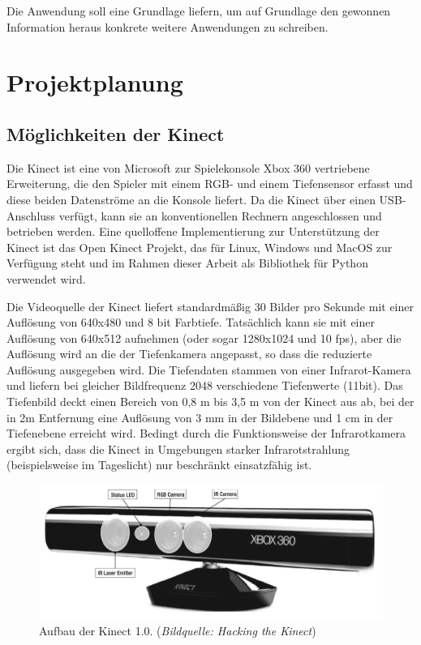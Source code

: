 \documentclass[12pt,a4paper,ngerman]{scrartcl}
\begin{document}
Die Anwendung soll eine Grundlage liefern, um auf Grundlage den gewonnen Information
heraus konkrete weitere Anwendungen zu schreiben.


\section{Projektplanung}

\subsection{Möglichkeiten der Kinect}
\label{sec:kinect}

Die Kinect ist eine von Microsoft\cite{microsoft} zur Spielekonsole Xbox 360 vertriebene Erweiterung,
die den Spieler mit einem RGB- und einem Tiefensensor erfasst und diese beiden
Datenströme an die Konsole liefert. Da die Kinect über einen USB-Anschluss verfügt,
kann sie an konventionellen Rechnern angeschlossen und betrieben werden. Eine
quelloffene Implementierung zur Unterstützung der Kinect ist das Open Kinect Projekt,
das für Linux, Windows und MacOS zur Verfügung steht und im Rahmen dieser Arbeit
als Bibliothek für Python verwendet wird.\cite{openkinect}\cite{libfreenect}

Die Videoquelle der Kinect liefert standardmäßig 30 Bilder pro Sekunde mit einer
Auflösung von 640x480 und 8 bit Farbtiefe. Tatsächlich kann sie mit
einer Auflösung von 640x512 aufnehmen (oder sogar 1280x1024 und 10 fps), aber die
Auflösung wird an die der Tiefenkamera angepasst, so dass die reduzierte Auflösung
ausgegeben wird. Die Tiefendaten stammen von einer
Infrarot-Kamera und liefern bei gleicher Bildfrequenz 2048 verschiedene
Tiefenwerte (11bit). Das Tiefenbild deckt einen Bereich von 0,8 m bis 3,5 m von der
Kinect aus ab, bei der in 2m Entfernung eine Auflösung von 3 mm in der Bildebene und
1 cm in der Tiefenebene erreicht wird. Bedingt durch die Funktionsweise der Infrarotkamera
ergibt sich, dass die Kinect in Umgebungen starker Infrarotstrahlung (beispielsweise
im Tageslicht) nur beschränkt einsatzfähig ist.\cite{hacking}

\begin{figure}[H]
    \centering
    \includegraphics[scale=0.33]{img/kinect_components.jpg}
    \caption{Aufbau der Kinect 1.0. ({\em Bildquelle: Hacking the Kinect\cite{hacking}})}
\end{figure}
\end{document}
